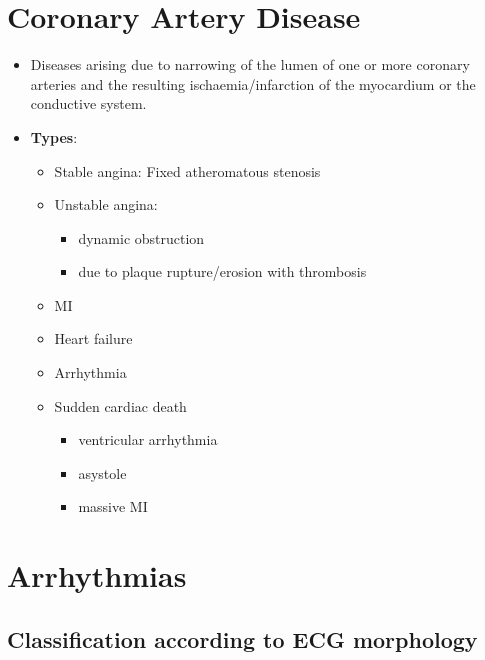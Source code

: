 \documentclass[
  12pt,
]{memoir}
\providecommand{\tightlist}{%
  \setlength{\itemsep}{0pt}\setlength{\parskip}{0pt}}
\begin{document}
\hypertarget{coronary-artery-disease}{%
\section{Coronary Artery Disease}\label{coronary-artery-disease}}

\begin{itemize}
\tightlist
\item
  Diseases arising due to narrowing of the lumen of one or more coronary
  arteries and the resulting ischaemia/infarction of the myocardium or
  the conductive system.
\item
  \textbf{Types}:

  \begin{itemize}
  \tightlist
  \item
    Stable angina: Fixed atheromatous stenosis
  \item
    Unstable angina:

    \begin{itemize}
    \tightlist
    \item
      dynamic obstruction
    \item
      due to plaque rupture/erosion with thrombosis
    \end{itemize}
  \item
    MI
  \item
    Heart failure
  \item
    Arrhythmia
  \item
    Sudden cardiac death

    \begin{itemize}
    \tightlist
    \item
      ventricular arrhythmia
    \item
      asystole
    \item
      massive MI
    \end{itemize}
  \end{itemize}
\end{itemize}

\hypertarget{arrhythmias}{%
\section{Arrhythmias}\label{arrhythmias}}

\hypertarget{classification-according-to-ecg-morphology}{%
\subsection{Classification according to ECG
morphology}\label{classification-according-to-ecg-morphology}}
\end{document}

